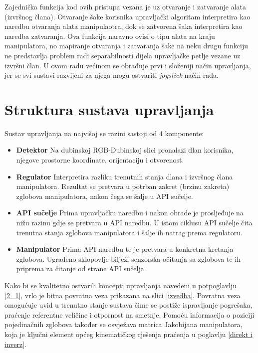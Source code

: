 \documentclass[times, utf8, diplomski, numeric]{fer}
\begin{document}
Zajednička funkcija kod ovih pristupa vezana je uz otvaranje i zatvaranje alata (izvršnog člana).
Otvaranje šake korisnika upravljački algoritam interpretira kao naredbu otvaranja alata manipulaotra, dok se zatvorena šaka interpretira kao naredba zatvaranja.
Ova funkcija naravno ovisi o tipu alata na kraju manipulatora, no mapiranje otvaranja i zatvaranja šake na neku drugu funkciju ne predstavlja problem radi separabilnosti dijela upravljačke petlje vezane uz izvršni član.
U ovom radu većinom se obrađuje prvi i složeniji način upravljanja, jer se svi sustavi razvijeni za njega mogu ostvariti \textit{joystick} način rada.



\section{Struktura sustava upravljanja}
Sustav upravljanja na najvišoj se razini sastoji od 4 komponente:
\begin{itemize}
  \item \textbf{Detektor} Na dubinskoj RGB-Dubinskoj slici pronalazi dlan korisnika, njegove prostorne koordinate, orijentaciju i otvorenost. 
  \item \textbf{Regulator} Interpretira razliku trenutnih stanja dlana i izvršnog člana manipulatora. 
  Rezultat se pretvara u potrban zakret (brzinu zakreta) zglobova manipulatora, nakon čega se šalje u API sučelje.
  \item  \textbf{API sučelje} Prima upravljačku naredbu i nakon obrade je prosljeđuje na nižu razinu gdje se pretvara u API naredbu.
  U istom ciklusu API sučelje čita trenutna stanja zglobova manipulatora i šalje ih natrag prema regulatoru.
  \item  \textbf{Manipulator} Prima API naredbu te je pretvara u konkretna kretanja zglobova. 
  Ugrađeno sklopovlje bilježi senzorska očitanja sa zglobova te ih priprema za čitanje od strane API sučelja.
\end{itemize}

Kako bi se kvalitetno ostvarili koncepti upravljanja navedeni u potpoglavlju \ref{2_1}, vrlo je bitna povratna veza prikazana na slici \ref{izvedba}.
Povratna veza omogućuje uvid u trenutno stanje sustava čime se postiže ispravljanje pogrešaka, praćenje referentne veličine i otpornost na smetnje.
Pomoću informacija o poziciji pojedinačnih zglobova također se osvježava matrica Jakobijana manipulatora, koja je ključni element općeg kinematičkog rješenja praćenja u poglavlju \ref{direkt i inverz}.
\end{document}
